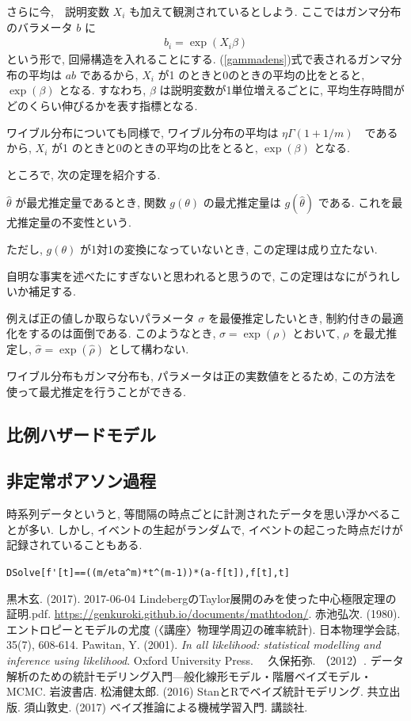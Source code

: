 \documentclass[a4paper, 12pt]{jarticle}
\begin{document}
さらに今,　説明変数 $X_i$ も加えて観測されているとしよう. 
ここではガンマ分布のバラメータ $b$ に
\begin{align}
b_i=\exp(X_i \beta)
\end{align}
という形で, 回帰構造を入れることにする.
(\ref{gammadens})式で表されるガンマ分布の平均は $a b$ であるから, $X_i$ が1 のときと0のときの平均の比をとると, $\exp(\beta)$ となる.
すなわち, $\beta$ は説明変数が1単位増えるごとに, 平均生存時間がどのくらい伸びるかを表す指標となる.

ワイブル分布についても同様で, ワイブル分布の平均は $\eta \Gamma(1+1/m)$　であるから, $X_i$ が1 のときと0のときの平均の比をとると, $\exp(\beta)$ となる.

ところで, 次の定理を紹介する. 

\begin{theorem}
$\hat \theta$ が最尤推定量であるとき, 関数 $g(\theta)$ の最尤推定量は $g(\hat \theta)$ である. これを最尤推定量の不変性という.
\end{theorem}
ただし, $g(\theta)$ が1対1の変換になっていないとき, この定理は成り立たない. 

自明な事実を述べたにすぎないと思われると思うので, この定理はなにがうれしいか補足する.

例えば正の値しか取らないパラメータ $\sigma$ を最優推定したいとき, 制約付きの最適化をするのは面倒である. このようなとき, $\sigma=\exp(\rho)$ とおいて, $\rho$ を最尤推定し, $\hat \sigma =\exp(\hat \rho)$ として構わない. 

ワイブル分布もガンマ分布も, パラメータは正の実数値をとるため, この方法を使って最尤推定を行うことができる.


\subsection{比例ハザードモデル}


\subsection{非定常ポアソン過程}
時系列データというと, 等間隔の時点ごとに計測されたデータを思い浮かべることが多い. しかし, イベントの生起がランダムで, イベントの起こった時点だけが記録されていることもある. 

\verb|DSolve[f'[t]==((m/eta^m)*t^(m-1))*(a-f[t]),f[t],t]|

\begin{thebibliography}{4}
黒木玄. (2017). 2017-06-04 LindebergのTaylor展開のみを使った中心極限定理の証明.pdf. \url{https://genkuroki.github.io/documents/mathtodon/}.
 赤池弘次. (1980). エントロピーとモデルの尤度 (〈講座〉物理学周辺の確率統計). 日本物理学会誌, 35(7), 608-614.
 Pawitan, Y. (2001). \textit{In all likelihood: statistical modelling and inference using likelihood}. Oxford University Press.
　久保拓弥. （2012）. データ解析のための統計モデリング入門---般化線形モデル・階層ベイズモデル・MCMC. 岩波書店.
 松浦健太郎. (2016) StanとRでベイズ統計モデリング. 共立出版.
 須山敦史. (2017) ベイズ推論による機械学習入門. 講談社.
\end{thebibliography}
\end{document}
